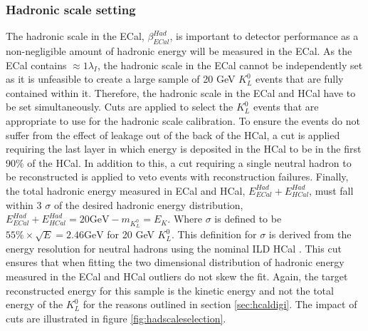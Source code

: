 
\subsubsection{Hadronic scale setting}
\label{sec:hadscalesetting}
The hadronic scale in the ECal, $\beta^{Had}_{ECal}$, is important to detector performance as a non-negligible amount of hadronic energy will be measured in the ECal.  As the ECal contains $\approx 1 \lambda_{I}$, the hadronic scale in the ECal cannot be independently set as it is unfeasible to create a large sample of 20 GeV $K^{0}_{L}$ events that are fully contained within it.  Therefore, the hadronic scale in the ECal and HCal have to be set simultaneously.  Cuts are applied to select the $K^{0}_{L}$ events that are appropriate to use for the hadronic scale calibration.  To ensure the events do not suffer from the effect of leakage out of the back of the HCal, a cut is applied requiring the last layer in which energy is deposited in the HCal to be in the first 90\% of the HCal.  In addition to this, a cut requiring a single neutral hadron to be reconstructed is applied to veto events with reconstruction failures.  Finally, the total hadronic energy measured in ECal and HCal, $E^{Had}_{ECal} + E^{Had}_{HCal}$, must fall within 3 $\sigma$ of the desired hadronic energy distribution, $E^{Had}_{ECal} + E^{Had}_{HCal} = 20 \text {GeV} - m_{K^{0}_{L}} = E_{K}$.  Where $\sigma$ is defined to be $55\% \times \sqrt{E} = 2.46 \text{GeV}$ for 20 GeV $K^{0}_{L}$.  This definition for $\sigma$ is derived from the energy resolution for neutral hadrons using the nominal ILD HCal \cite{Behnke:2013lya}.  This cut ensures that when fitting the two dimensional distribution of hadronic energy measured in the ECal and HCal outliers do not skew the fit.  Again, the target reconstructed energy for this sample is the kinetic energy and not the total energy of the $K^{0}_{L}$ for the reasons outlined in section \ref{sec:hcaldigi}.  The impact of cuts are illustrated in figure \ref{fig:hadscaleselection}.

